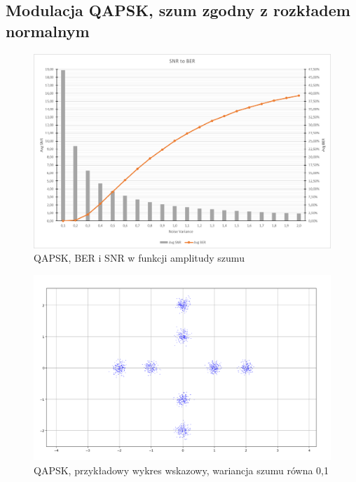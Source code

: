 \documentclass{article}
\begin{document}
	\subsection{Modulacja QAPSK, szum zgodny z rozkładem normalnym}
		\begin{figure}[H]
			\centering
			\includegraphics[width=0.8\linewidth]{img/chart/qapsk_snr_ber.png}
			\caption{QAPSK, BER i SNR w funkcji amplitudy szumu}
			\label{fig:qapsk_snr_ber}
		\end{figure}

		\begin{figure}[H]
			\centering
			\includegraphics[width=0.8\linewidth]{img/chart/qapsk_var01_const.png}
			\caption{QAPSK, przykładowy wykres wskazowy, wariancja szumu równa 0,1}
			\label{fig:qapsk_const}
		\end{figure}
\end{document}
